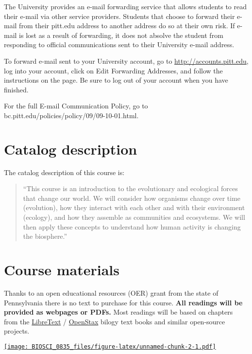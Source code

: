 \documentclass[
]{book}
\begin{document}
The University provides an e-mail forwarding service that allows students to read their e-mail via other service providers. Students that choose to forward their e-mail from their pitt.edu address to another address do so at their own risk. If e-mail is lost as a result of forwarding, it does not absolve the student from responding to official communications sent to their University e-mail address.

To forward e-mail sent to your University account, go to \url{http://accounts.pitt.edu}, log into your account, click on Edit Forwarding Addresses, and follow the instructions on the page. Be sure to log out of your account when you have finished.

For the full E-mail Communication Policy, go to bc.pitt.edu/policies/policy/09/09-10-01.html.

\hypertarget{catalog-description}{%
\chapter{Catalog description}\label{catalog-description}}

The catalog description of this course is:

\begin{quote}
``This course is an introduction to the evolutionary and ecological forces that change our world. We will consider how organisms change over time (evolution), how they interact with each other and with their environment (ecology), and how they assemble as communities and ecosystems. We will then apply these concepts to understand how human activity is changing the biosphere.''
\end{quote}

\hypertarget{course-materials}{%
\chapter{Course materials}\label{course-materials}}

Thanks to an open educational resources (OER) grant from the state of Pennsylvania there is no text to purchase for this course. \textbf{All readings will be provided as webpages or PDFs.} Most readings will be based on chapters from the \href{https://bio.libretexts.org/Bookshelves/Introductory_and_General_Biology/Book\%3A_General_Biology_(OpenStax)}{LibreText} / \href{https://openstax.org/details/books/biology-2e}{OpenStax} bilogy text books and similar open-source projects.

\href{https://upload.wikimedia.org/wikipedia/en/c/c6/Openstax_logo.png}{\texttt{[image: BIOSCI\_0835\_files/figure-latex/unnamed-chunk-2-1.pdf]}}
\end{document}

